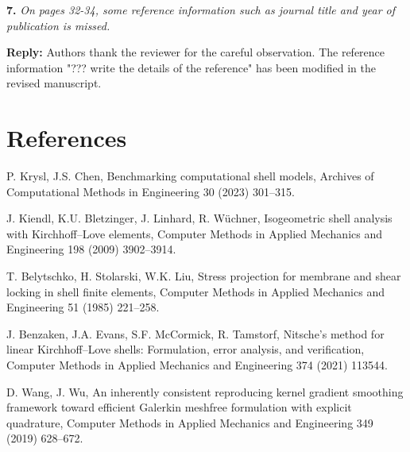 \documentclass{article}
\begin{document}
\textbf{7.} \textit{On pages 32-34, some reference information such as journal title and year of publication is missed.}

\textbf{Reply:} Authors thank the reviewer for the careful observation. The reference information "??? write the details of the reference" has been modified in the revised manuscript.

\section*{References}
\begin{enumerate}[{[1]}]
    \item P. Krysl, J.S. Chen, Benchmarking computational shell models, Archives of Computational Methods in Engineering 30 (2023) 301–315. 
    \item J. Kiendl, K.U. Bletzinger, J. Linhard, R. Wüchner, Isogeometric shell analysis with Kirchhoff–Love elements, Computer Methods in Applied Mechanics and Engineering 198 (2009) 3902–3914. 
    \item T. Belytschko, H. Stolarski, W.K. Liu, Stress projection for membrane and shear locking in shell finite elements, Computer Methods in Applied Mechanics and Engineering 51 (1985) 221–258. 
    \item J. Benzaken, J.A. Evans, S.F. McCormick, R. Tamstorf, Nitsche’s method for linear Kirchhoff–Love shells: Formulation, error analysis, and verification, Computer Methods in Applied Mechanics and Engineering 374 (2021) 113544. 
    \item D. Wang, J. Wu, An inherently consistent reproducing kernel gradient smoothing framework toward efficient Galerkin meshfree formulation with explicit quadrature, Computer Methods in Applied Mechanics and Engineering 349 (2019) 628–672. 
\end{enumerate}
\end{document}
